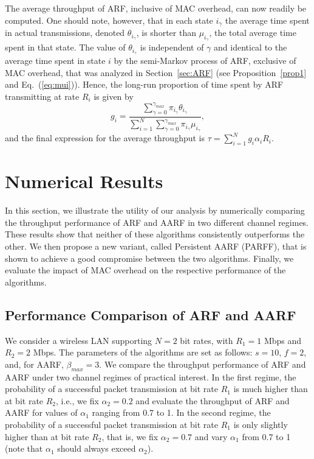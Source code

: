 \documentclass[11pt, journal, letterpaper, oneside, onecolumn]{IEEEtran}
\begin{document}
The average throughput of ARF, inclusive of MAC overhead, can now readily be computed. One should note, however, that in each state $i_{\gamma}$ the average time spent in actual transmissions, denoted  $\theta_{i_{\gamma}}$, is shorter than $\mu_{i_{\gamma}}$, the total average time spent in that state. The value of $\theta_{i_{\gamma}}$ is independent of $\gamma$ and identical to the average time spent in state $i$ by the semi-Markov process of ARF, exclusive of MAC overhead, that was analyzed in Section~\ref{sec:ARF} (see  Proposition~\ref{prop1} and Eq.~(\ref{eq:mui})).
Hence, the long-run proportion of time spent by ARF transmitting at rate $R_i$ is given by
\begin{equation}\label{eq:frac_back_off}
g_{i}=\frac{\sum_{\gamma=0}^{\gamma_{max}}{\pi_{i_{\gamma}}\theta_{i_{\gamma}}}}
{\sum_{i=1}^{N}\sum_{\gamma=0}^{\gamma_{max}}{\pi_{i_{\gamma}}\mu_{i_{\gamma}}}},
\end{equation}
and the final expression for the average throughput is
$
\tau=\sum_{i=1}^{N} g_{i} \alpha_{i}R_{i}$.

\section {Numerical Results}
\label{sec:Numercial Analysis}


In this section, we illustrate the utility of our analysis by
numerically comparing the throughput performance of ARF and AARF
in two different channel regimes. These results show that neither
of these algorithms consistently outperforms the other. We then
propose a new variant, called Persistent AARF (PARFF), that is
shown to achieve a good compromise between the two algorithms.
Finally, we evaluate the impact of MAC overhead on the respective performance of the algorithms.

\subsection{Performance Comparison of ARF and AARF}

We consider a wireless LAN supporting $N=2$ bit rates, with $R_1=
1$ Mbps and $R_2=2$ Mbps. The parameters of the algorithms are set
as follows: $s=10$, $f=2$, and, for AARF, $\beta_{max}=3$. We
compare the throughput performance of ARF and AARF under two
channel regimes of practical interest.  In the first regime, the
probability of a successful packet transmission at bit rate $R_1$
is much higher than at bit rate $R_2$, i.e., we fix $\alpha_2=0.2$
and evaluate the throughput of ARF and AARF for values of
$\alpha_1$ ranging from 0.7 to 1. In the second regime, the
probability of a successful packet transmission at bit rate $R_1$
is only slightly higher than at bit rate $R_2$, that is, we fix
$\alpha_2=0.7$ and vary $\alpha_1$ from 0.7 to 1 (note that
$\alpha_1$ should always exceed $\alpha_2$).
\end{document}
